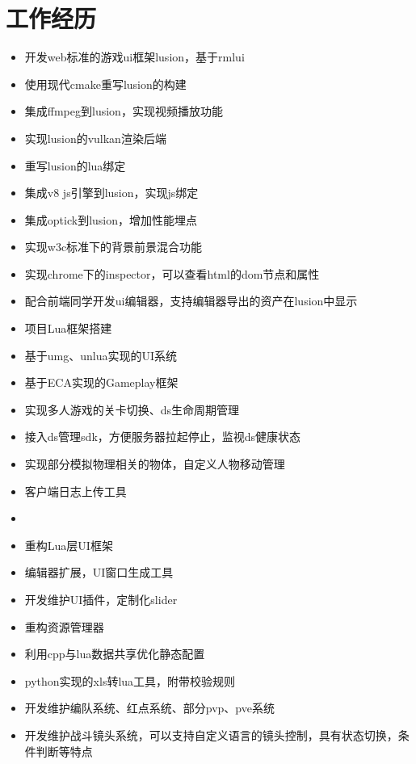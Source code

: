 \documentclass{resume}
\begin{document}
\section{工作经历}
\begin{itemize}
  \item 开发web标准的游戏ui框架lusion，基于rmlui
  \item 使用现代cmake重写lusion的构建
  \item 集成ffmpeg到lusion，实现视频播放功能
  \item 实现lusion的vulkan渲染后端
  \item 重写lusion的lua绑定
  \item 集成v8 js引擎到lusion，实现js绑定
  \item 集成optick到lusion，增加性能埋点
  \item 实现w3c标准下的背景前景混合功能
  \item 实现chrome下的inspector，可以查看html的dom节点和属性
  \item 配合前端同学开发ui编辑器，支持编辑器导出的资产在lusion中显示
\end{itemize}
\begin{itemize}
  \item 项目Lua框架搭建
  \item 基于umg、unlua实现的UI系统
  \item 基于ECA实现的Gameplay框架
  \item 实现多人游戏的关卡切换、ds生命周期管理
  \item 接入ds管理sdk，方便服务器拉起停止，监视ds健康状态
  \item 实现部分模拟物理相关的物体，自定义人物移动管理
  \item 客户端日志上传工具
  \item 
\end{itemize}
\begin{itemize}
  \item 重构Lua层UI框架
  \item 编辑器扩展，UI窗口生成工具
  \item 开发维护UI插件，定制化slider
  \item 重构资源管理器
  \item 利用cpp与lua数据共享优化静态配置
  \item python实现的xls转lua工具，附带校验规则
  \item 开发维护编队系统、红点系统、部分pvp、pve系统
  \item 开发维护战斗镜头系统，可以支持自定义语言的镜头控制，具有状态切换，条件判断等特点
\end{itemize}



%
%
\end{document}
